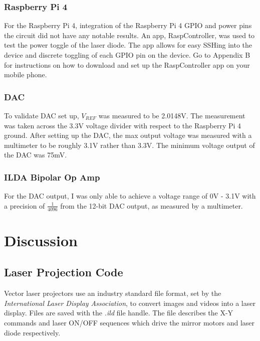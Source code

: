 \documentclass[journal]{IEEEtran}
\begin{document}
    \subsubsection{Raspberry Pi 4}

    For the Raspberry Pi 4, integration of the Raspberry Pi 4 GPIO and power pins the circuit did not have any notable results.
    An app, RaspController, was used to test the power toggle of the laser diode. 
    The app allows for easy SSHing into the device and discrete toggling of each GPIO pin on the device.
    Go to Appendix B for instructions on how to download and set up the RaspController app on your mobile phone. 

    \subsubsection{DAC}

    To validate DAC set up, $V_{REF}$ was measured to be 2.0148V.
    The measurement was taken across the 3.3V voltage divider with respect to the Raspberry Pi 4 ground.
    After setting up the DAC, the max output voltage was measured with a multimeter to be roughly 3.1V rather than 3.3V. 
    The minimum voltage output of the DAC was 75mV.

    \subsubsection{ILDA Bipolar Op Amp}
    For the DAC output, I was only able to achieve a voltage range of 0V - 3.1V with a precision of $\frac{1}{4096}$ from the 12-bit DAC output, as measured by a multimeter.

    \section{Discussion}
    \subsection{Laser Projection Code}
    Vector laser projectors use an industry standard file format, set by the \emph{International Laser Display Association}, to convert images and videos into a laser display.
    Files are saved with the \emph{.ild} file handle.
    The file describes the X-Y commands and laser ON/OFF sequences which drive the mirror motors and laser diode respectively.
\end{document}
